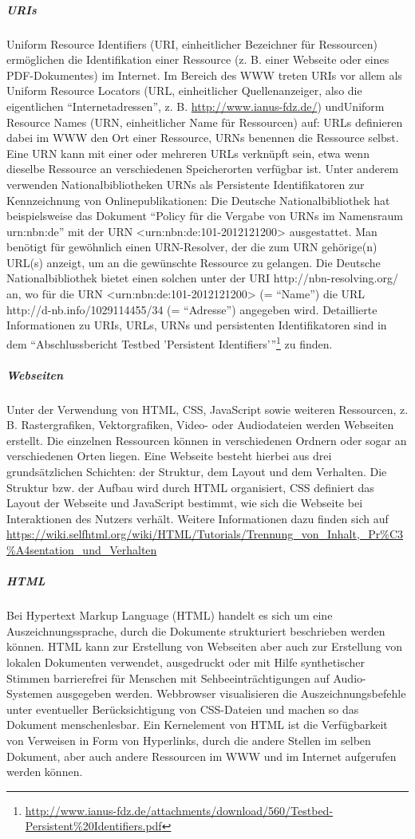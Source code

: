 \subparagraph{URIs}
Uniform Resource Identifiers (URI, einheitlicher Bezeichner für Ressourcen) ermöglichen die Identifikation einer Ressource (z. B. einer Webseite oder eines PDF-Dokumentes) im Internet. Im Bereich des WWW treten URIs vor allem als Uniform Resource Locators (URL, einheitlicher Quellenanzeiger, also die eigentlichen "`Internetadressen"', z. B. \url{http://www.ianus-fdz.de/}) undUniform Resource Names (URN, einheitlicher Name für Ressourcen) auf: URLs definieren dabei im WWW den Ort einer Ressource, URNs benennen die Ressource selbst. Eine URN kann mit einer oder mehreren URLs verknüpft sein, etwa wenn dieselbe Ressource an verschiedenen Speicherorten verfügbar ist. Unter anderem verwenden Nationalbibliotheken URNs als Persistente Identifikatoren zur Kennzeichnung von Onlinepublikationen: Die Deutsche Nationalbibliothek hat beispielsweise das Dokument "`Policy für die Vergabe von URNs im Namensraum urn:nbn:de"' mit der URN <urn:nbn:de:101-2012121200> ausgestattet. Man benötigt für gewöhnlich einen URN-Resolver, der die zum URN gehörige(n) URL(s) anzeigt, um an die gewünschte Ressource zu gelangen. Die Deutsche Nationalbibliothek bietet einen solchen unter der URI http://nbn-resolving.org/ an, wo für die URN <urn:nbn:de:101-2012121200> (= "`Name"')  die URL http://d-nb.info/1029114455/34 (= "`Adresse"') angegeben wird. Detaillierte Informationen zu URIs, URLs, URNs und persistenten Identifikatoren sind in dem "`Abschlussbericht Testbed 'Persistent Identifiers'"'\footnote{\url{http://www.ianus-fdz.de/attachments/download/560/Testbed-Persistent\%20Identifiers.pdf}} zu finden.

\subparagraph{Webseiten} 
Unter der Verwendung von HTML, CSS, JavaScript sowie weiteren Ressourcen, z. B. Rastergrafiken, Vektorgrafiken, Video- oder Audiodateien werden Webseiten erstellt. Die einzelnen Ressourcen können in verschiedenen Ordnern oder sogar an verschiedenen Orten liegen. Eine Webseite besteht hierbei aus drei grundsätzlichen Schichten: der Struktur, dem Layout und dem Verhalten. Die Struktur bzw. der Aufbau wird durch HTML organisiert, CSS definiert das Layout der Webseite und JavaScript bestimmt, wie sich die Webseite bei Interaktionen des Nutzers verhält. Weitere Informationen dazu finden sich auf \url{https://wiki.selfhtml.org/wiki/HTML/Tutorials/Trennung_von_Inhalt,_Pr\%C3\%A4sentation_und_Verhalten} 

\subparagraph{HTML}
Bei Hypertext Markup Language (HTML) handelt es sich um eine Auszeichnungssprache, durch die Dokumente strukturiert beschrieben werden können. HTML kann zur Erstellung von Webseiten aber auch zur Erstellung von lokalen Dokumenten verwendet, ausgedruckt oder mit Hilfe synthetischer Stimmen barrierefrei für Menschen mit Sehbeeinträchtigungen auf Audio-Systemen ausgegeben werden. Webbrowser visualisieren die Auszeichnungsbefehle unter eventueller Berücksichtigung von CSS-Dateien und machen so das Dokument menschenlesbar. Ein Kernelement von HTML ist die Verfügbarkeit von Verweisen in Form von Hyperlinks, durch die andere Stellen im selben Dokument, aber auch andere Ressourcen im WWW und im Internet aufgerufen werden können. 


